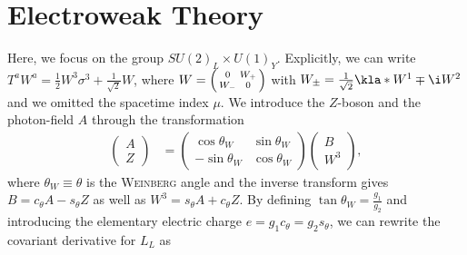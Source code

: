 \documentclass[english, parskip=full]{scrbook}
\begin{document}
\section{Electroweak Theory}
Here, we focus on the group $SU(2)_L\times U(1)_Y$.
Explicitly, we can write $T^a W^a = \frac{1}{2}W^3\sigma^3 + \frac{1}{\sqrt{2}}W$, where $W=\begin{psmallmatrix} 0 & W_+ \\ W_- & 0 \end{psmallmatrix}$ with $W_\pm = \frac{1}{\sqrt{2}}\kla*{W^1 \mp \i W^2}$ and we omitted the spacetime index $\mu$.
We introduce the $Z$-boson and the photon-field $A$ through the transformation
\begin{align}
\begin{pmatrix}
A \\ Z
\end{pmatrix} &= \begin{pmatrix}
\cos\theta_W & \sin\theta_W \\ -\sin\theta_W & \cos\theta_W
\end{pmatrix} \begin{pmatrix}
B \\ W^3
\end{pmatrix},
\end{align}
where $\theta_W\equiv \theta$ is the \textsc{Weinberg} angle and the inverse transform gives $B=c_\theta A - s_\theta Z$ as well as $W^3 = s_\theta A + c_\theta Z$.
By defining $\tan \theta_W = \frac{g_1}{g_2}$ and introducing the elementary electric charge $e=g_1c_\theta=g_2s_\theta$, we can rewrite the covariant derivative for $L_L$ as
\end{document}
